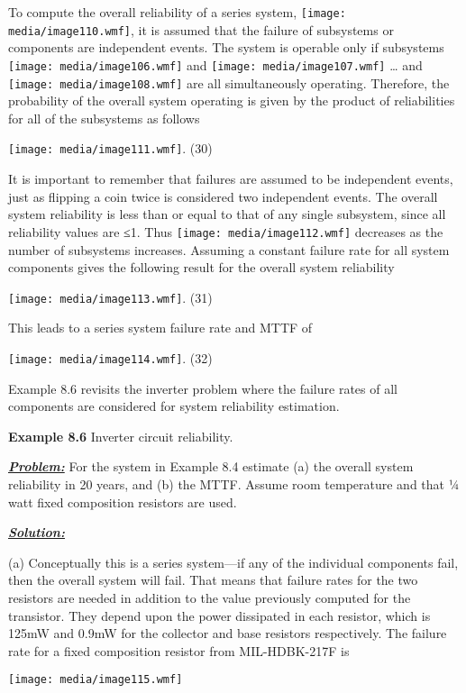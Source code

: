 To compute the overall reliability of a series system,
\texttt{[image: media/image110.wmf]}, it is assumed that the failure of
subsystems or components are independent events. The system is operable
only if subsystems \texttt{[image: media/image106.wmf]} and
\texttt{[image: media/image107.wmf]} \ldots{} and
\texttt{[image: media/image108.wmf]} are all simultaneously operating.
Therefore, the probability of the overall system operating is given by
the product of reliabilities for all of the subsystems as follows

\texttt{[image: media/image111.wmf]}. (30)

It is important to remember that failures are assumed to be independent
events, just as flipping a coin twice is considered two independent
events. The overall system reliability is less than or equal to that of
any single subsystem, since all reliability values are ≤1. Thus
\texttt{[image: media/image112.wmf]} decreases as the number of
subsystems increases. Assuming a constant failure rate for all system
components gives the following result for the overall system reliability

\texttt{[image: media/image113.wmf]}. (31)

This leads to a series system failure rate and MTTF of

\texttt{[image: media/image114.wmf]}. (32)

Example 8.6 revisits the inverter problem where the failure rates of all
components are considered for system reliability estimation.

\textbf{\hfill\break
Example 8.6} Inverter circuit reliability.

\emph{\textbf{\ul{Problem:}}} For the system in Example 8.4 estimate (a)
the overall system reliability in 20 years, and (b) the MTTF. Assume
room temperature and that ¼ watt fixed composition resistors are used.

\emph{\textbf{\ul{Solution:}}}

(a) Conceptually this is a series system---if any of the individual
components fail, then the overall system will fail. That means that
failure rates for the two resistors are needed in addition to the value
previously computed for the transistor. They depend upon the power
dissipated in each resistor, which is 125mW and 0.9mW for the collector
and base resistors respectively. The failure rate for a fixed
composition resistor from MIL-HDBK-217F is

\texttt{[image: media/image115.wmf]}

